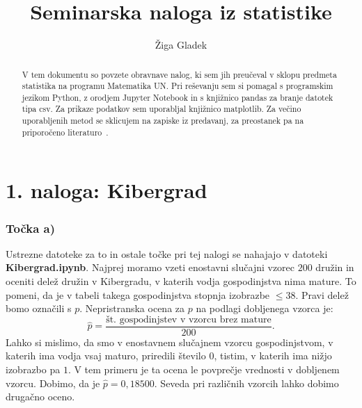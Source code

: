 \documentclass[12pt, letterpaper]{article}
\title{Seminarska naloga iz statistike}
\author{Žiga Gladek}
\begin{document}
\maketitle

\renewcommand{\abstractname}{Povzetek}
\begin{abstract}
V tem dokumentu so povzete obravnave nalog, ki sem jih preučeval v sklopu predmeta statistika na programu Matematika UN. Pri reševanju sem si pomagal s programskim jezikom Python, z orodjem Jupyter Notebook in s knjižnico pandas za branje datotek tipa csv. Za prikaze podatkov sem uporabljal knjižnico matplotlib. Za večino uporabljenih metod se sklicujem na zapiske iz predavanj, za preostanek pa na priporočeno literaturo~\cite{Rice}.
\end{abstract}

\section*{1. naloga: Kibergrad}

\subsubsection*{Točka a)} Ustrezne datoteke za to in ostale točke pri tej nalogi se nahajajo v datoteki \textbf{Kibergrad.ipynb}. Najprej moramo vzeti enostavni slučajni vzorec $200$ družin in oceniti delež družin v Kibergradu, v katerih vodja gospodinjstva nima mature. To pomeni, da je v tabeli takega gospodinjstva stopnja izobrazbe $\leq 38$. Pravi delež bomo označili s $p$. Nepristranska ocena za $p$ na podlagi dobljenega vzorca je:
\[
\hat{p} = \frac{\text{št. gospodinjstev v vzorcu brez mature}}{200}.
\]
Lahko si mislimo, da smo v enostavnem slučajnem vzorcu gospodinjstvom, v katerih ima vodja vsaj maturo, priredili število $0$, tistim, v katerih ima nižjo izobrazbo pa $1$. V tem primeru je ta ocena le povprečje vrednosti v dobljenem vzorcu. Dobimo, da je $\hat{p} = 0,18500$. Seveda pri različnih vzorcih lahko dobimo drugačno oceno.
\end{document}
